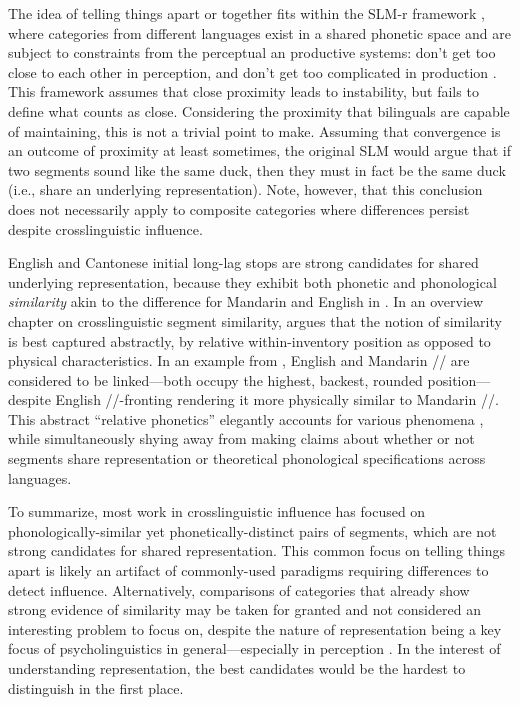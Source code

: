 The idea of telling things apart or together fits within the SLM-r framework \citep{flege_2021_slmr}, where categories from different languages exist in a shared phonetic space and are subject to constraints from the perceptual an productive systems: don't get too close to each other in perception, and don't get too complicated in production \citep{guion_2003_systems,lindblom_1988_universals, flege_1995_slm}. This framework assumes that close proximity leads to instability, but fails to define what counts as close. Considering the proximity that bilinguals are capable of maintaining, this is not a trivial point to make. Assuming that convergence is an outcome of proximity at least sometimes, the original SLM would argue that if two segments sound like the same duck, then they must in fact be the same duck (i.e., share an underlying representation). Note, however, that this conclusion does not necessarily apply to composite categories where differences persist despite crosslinguistic influence.
 
English and Cantonese initial long-lag stops are strong candidates for shared underlying representation, because they exhibit both phonetic and phonological \textit{similarity} akin to the difference for Mandarin and English in \citep{yang_2019_vot}. In an overview chapter on crosslinguistic segment similarity, \citep{chang_2015_similarity} argues that the notion of similarity is best captured abstractly, by relative within-inventory position as opposed to physical characteristics. In an example from \citep{chang_2015_similarity}, English and Mandarin // are considered to be linked---both occupy the highest, backest, rounded position---despite English //-fronting rendering it more physically similar to Mandarin //. This abstract ``relative phonetics'' elegantly accounts for various phenomena \citep{chang_2015_similarity}, while simultaneously shying away from making claims about whether or not segments share representation or theoretical phonological specifications across languages. 

To summarize, most work in crosslinguistic influence has focused on phonologically-similar yet phonetically-distinct pairs of segments, which are not strong candidates for shared representation. This common focus on telling things apart is likely an artifact of commonly-used paradigms requiring differences to detect influence. Alternatively, comparisons of categories that already show strong evidence of similarity may be taken for granted and not considered an interesting problem to focus on, despite the nature of representation being a key focus of psycholinguistics in general---especially in perception \citep{samuel_2020_resist}. In the interest of understanding representation, the best candidates would be the hardest to distinguish in the first place. 

